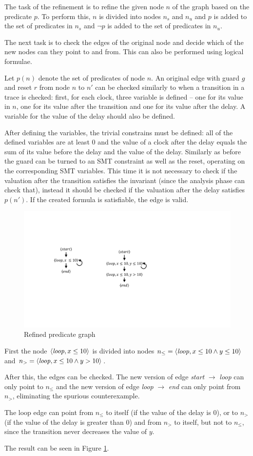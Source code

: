 The task of the refinement is to refine the given node $n$ of the graph based on the predicate $p$. To perform this, $n$ is divided into nodes $n_s$ and $n_u$ and $p$ is added to the set of predicates in $n_s$ and $\neg p$ is added to the set of predicates in $n_u$.

The next task is to check the edges of the original node and decide which of the new nodes can they point to and from. This can also be performed using logical formulae.

Let $p(n)$ denote the set of predicates of node $n$. An original edge with guard $g$ and reset $r$ from node $n$ to $n'$ can be checked similarly to when a transition in a trace is checked: first, for each clock, three variable is defined -- one for its value in $n$, one for its value after the transition and one for its value after the delay. A variable for the value of the delay should also be defined.

After defining the variables, the trivial constrains must be defined: all of the defined variables are at least 0 and the value of a clock after the delay equals the sum of its value before the delay and the value of the delay. Similarly as before the guard can be turned to an SMT constraint as well as the reset, operating on the corresponding SMT variables. This time it is not necessary to check if the valuation after the transition satisfies the invariant (since the analysis phase can check that), instead it should be checked if the valuation after the delay satisfies $p(n')$. If the created formula is satisfiable, the edge is valid.

\begin{figure} 
	\centering
	\includegraphics[width=.3\textwidth]{include/figures/runex_pred_ref}
	\caption{Refined predicate graph}
	\label{fig:predref}
\end{figure}

\begin{runningExample}
	First the node $ \langle \text{\emph{loop}}, x \leq 10 \rangle$ is divided into nodes $ n_\leq = \langle \text{\emph{loop}}, x \leq 10 \wedge y \leq 10 \rangle$ and $n_> = \langle \text{\emph{loop}}, x \leq 10 \wedge y>10 \rangle$.
	
	After this, the edges can be checked. The new version of edge \emph{start} $\to$ \emph{loop} can only point to $n_\leq$ and the new version of edge \emph{loop} $\to$ \emph{end} can only point from $n_>$, eliminating the spurious counterexample.
	
	The loop edge can point from $n_\leq$ to itself (if the value of the delay is 0), or to $n_>$ (if the value of the delay is greater than 0) and from $n_>$ to itself, but not to $n_\leq$, since the transition never decreases the value of $y$.
	
	The result can be seen in Figure \ref{fig:predref}.
	
\end{runningExample}

